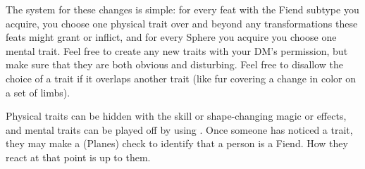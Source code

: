 The system for these changes is simple: for every feat with the Fiend subtype you acquire, you choose one physical trait over and beyond any transformations these feats might grant or inflict, and for every Sphere you acquire you choose one mental trait. Feel free to create any new traits with your DM's permission, but make sure that they are both obvious and disturbing. Feel free to disallow the choice of a trait if it overlaps another trait (like fur covering a change in color on a set of limbs).

Physical traits can be hidden with the  skill or shape-changing magic or effects, and mental traits can be played off by using . Once someone has noticed a trait, they may make a  (Planes) check to identify that a person is a Fiend. How they react at that point is up to them.

\pagebreak

